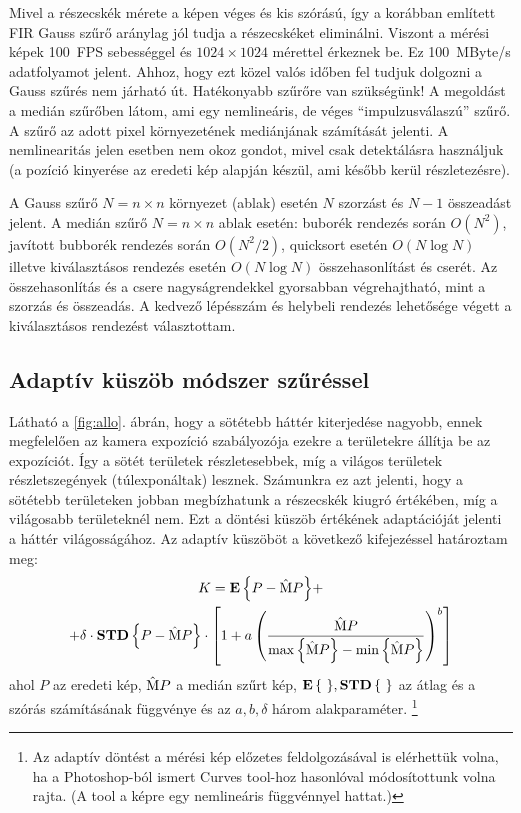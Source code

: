 	Mivel a részecskék mérete a képen véges és kis szórású, így a korábban
	említett FIR Gauss szűrő aránylag jól tudja a részecskéket eliminálni.
	Viszont a mérési képek 100~FPS sebességgel és $1024\times1024$ mérettel érkeznek be.
	Ez 100~MByte/s adatfolyamot jelent. Ahhoz, hogy ezt közel
        valós időben fel tudjuk dolgozni
	a Gauss szűrés nem járható út. Hatékonyabb szűrőre van szükségünk! A megoldást a medián szűrőben látom,
	ami egy nemlineáris, de véges ``impulzusválaszú'' szűrő.
	A szűrő az adott pixel környezetének mediánjának számítását jelenti.
	A nemlinearitás jelen esetben nem okoz gondot, mivel csak detektálásra használjuk (a pozíció
	kinyerése az eredeti kép alapján készül, ami később kerül részletezésre).
	
	A Gauss szűrő $N = n\times n$ környezet (ablak) esetén $N$ szorzást és $N-1$ összeadást jelent. A medián szűrő $N = n\times n$
	ablak esetén: buborék rendezés során $O(N^2)$, javított bubborék rendezés során $O(N^2 / 2)$, quicksort esetén $O(N\log N)$
	illetve kiválasztásos rendezés esetén $O(N\log N)$ összehasonlítást és cserét.
	Az összehasonlítás és a csere nagyságrendekkel gyorsabban végrehajtható, mint a szorzás és
	összeadás. A kedvező lépésszám és helybeli rendezés lehetősége végett a kiválasztásos rendezést választottam.
	
\subsection{Adaptív küszöb módszer szűréssel}
	Látható a \ref{fig:allo}. ábrán, hogy a sötétebb háttér kiterjedése nagyobb, ennek megfelelően az
	kamera expozíció szabályozója ezekre a területekre állítja be az expozíciót.
	Így a sötét területek részletesebbek, míg a világos területek részletszegények (túlexponáltak) lesznek.
	Számunkra ez azt jelenti, hogy a sötétebb területeken jobban megbízhatunk a részecskék kiugró
	értékében, míg a világosabb területeknél nem.
	Ezt a döntési küszöb értékének adaptációját jelenti a háttér világosságához.
	Az adaptív küszöböt a következő kifejezéssel határoztam meg:
	\begin{multline}
		\label{eq:treshold}
		K = {\mathop{\bf E\/}\left\{P-\mathrm{\hat{M}}P\right\}}+\\
		  + \delta \cdot {\mathop{\bf STD\/}\left\{P - \mathrm{\hat{M}}P\right\}} \cdot 
		\left[ 1+ a \left(
			\frac{\mathrm{\hat{M}}P}{\max\left\{\mathrm{\hat{M}}P\right\} - \min\left\{\mathrm{\hat{M}}P\right\}}
			\right)^b
		\right]
	\end{multline}
	ahol $P$ az eredeti kép, $\mathrm{\hat{M}} P$ a medián szűrt kép, ${\mathop{\bf E\/}\left\{\ \right\}}, {\mathop{\bf STD\/}\left\{\ \right\}}$ az
	átlag és a szórás számításának függvénye és az $a, b, \delta$ három alakparaméter.
	\footnote{Az adaptív döntést a mérési kép előzetes feldolgozásával is elérhettük volna,
	ha a Photoshop-ból ismert Curves tool-hoz hasonlóval módosítottunk volna rajta. (A tool a képre egy nemlineáris
	függvénnyel hattat.)}
	
